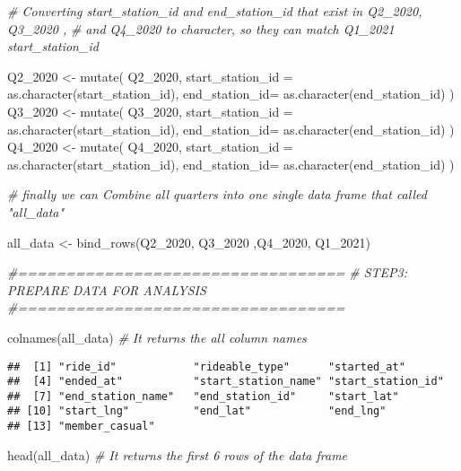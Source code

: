 \documentclass[
]{article}
\newenvironment{Shaded}{\begin{snugshade}}{\end{snugshade}}
\newcommand{\AttributeTok}[1]{\textcolor[rgb]{0.77,0.63,0.00}{#1}}
\newcommand{\CommentTok}[1]{\textcolor[rgb]{0.56,0.35,0.01}{\textit{#1}}}
\newcommand{\FunctionTok}[1]{\textcolor[rgb]{0.00,0.00,0.00}{#1}}
\newcommand{\NormalTok}[1]{#1}
\newcommand{\OtherTok}[1]{\textcolor[rgb]{0.56,0.35,0.01}{#1}}
\begin{document}
\begin{Shaded}
\begin{Highlighting}[]
\CommentTok{\# Converting start\_station\_id and end\_station\_id that exist in Q2\_2020, Q3\_2020 , }
\CommentTok{\# and Q4\_2020 to character, so they can match Q1\_2021 start\_station\_id}
 
\NormalTok{ Q2\_2020 }\OtherTok{\textless{}{-}} \FunctionTok{mutate}\NormalTok{( Q2\_2020, }\AttributeTok{start\_station\_id =} \FunctionTok{as.character}\NormalTok{(start\_station\_id), }\AttributeTok{end\_station\_id=} \FunctionTok{as.character}\NormalTok{(end\_station\_id)  )}
\NormalTok{ Q3\_2020 }\OtherTok{\textless{}{-}} \FunctionTok{mutate}\NormalTok{( Q3\_2020, }\AttributeTok{start\_station\_id =} \FunctionTok{as.character}\NormalTok{(start\_station\_id), }\AttributeTok{end\_station\_id=} \FunctionTok{as.character}\NormalTok{(end\_station\_id)  )}
\NormalTok{ Q4\_2020 }\OtherTok{\textless{}{-}} \FunctionTok{mutate}\NormalTok{( Q4\_2020, }\AttributeTok{start\_station\_id =} \FunctionTok{as.character}\NormalTok{(start\_station\_id), }\AttributeTok{end\_station\_id=} \FunctionTok{as.character}\NormalTok{(end\_station\_id)  )}

\CommentTok{\# finally we can Combine all quarters into one single data frame that called "all\_data"}
 
\NormalTok{ all\_data }\OtherTok{\textless{}{-}} \FunctionTok{bind\_rows}\NormalTok{(Q2\_2020, Q3\_2020 ,Q4\_2020, Q1\_2021)}
 

\CommentTok{\#==================================}
\CommentTok{\# STEP3: PREPARE DATA FOR ANALYSIS}
\CommentTok{\#==================================}
 
 \FunctionTok{colnames}\NormalTok{(all\_data) }\CommentTok{\# It returns the all column names}
\end{Highlighting}
\end{Shaded}

\begin{verbatim}
##  [1] "ride_id"            "rideable_type"      "started_at"        
##  [4] "ended_at"           "start_station_name" "start_station_id"  
##  [7] "end_station_name"   "end_station_id"     "start_lat"         
## [10] "start_lng"          "end_lat"            "end_lng"           
## [13] "member_casual"
\end{verbatim}

\begin{Shaded}
\begin{Highlighting}[]
 \FunctionTok{head}\NormalTok{(all\_data) }\CommentTok{\# It returns the first 6 rows of the data frame}
\end{Highlighting}
\end{Shaded}
\end{document}
